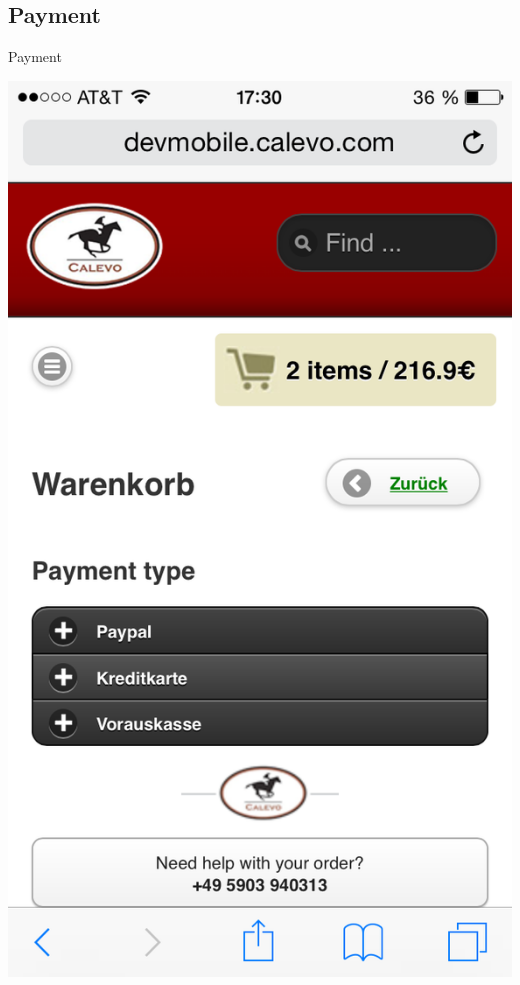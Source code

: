 \subsection{Payment}
\begin{frame}{Payment}
\begin{center}
  \includegraphics[width=\textwidth,height=1\textheight,keepaspectratio]{pics/payment.png}
\end{center}
\end{frame}

